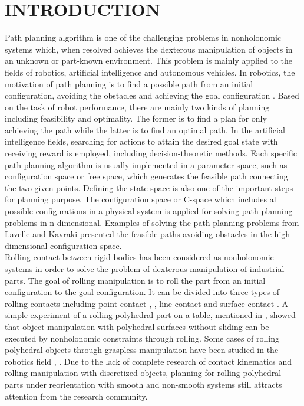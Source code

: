 
\section{INTRODUCTION}
\noindent Path planning algorithm is one of the challenging problems in nonholonomic systems which, when resolved achieves the dexterous manipulation of objects in an unknown or part-known environment. 
This problem is mainly applied to the fields of robotics, artificial intelligence and autonomous vehicles. 
In robotics, the motivation of path planning is to find a possible path from an initial configuration, avoiding the obstacles and achieving the goal configuration \cite{Zhang2018_PP_mobileRobot}. 
Based on the task of robot performance, there are mainly two kinds of planning including feasibility and optimality. 
The former is to find a plan for only achieving the path while the latter is to find an optimal path. 
In the artificial intelligence fields, searching for actions to attain the desired goal state with receiving reward is employed, including decision-theoretic methods. 
Each specific path planning algorithm is usually implemented in a parameter space, such as configuration space or free space, which generates the feasible path connecting the two given points. 
Defining the state space is also one of the important steps for planning purpose. The configuration space or C-space which includes all possible configurations in a physical system is applied for solving path planning problems in n-dimensional. 
Examples of solving the path planning problems from Lavelle \cite{LaValle06_PlanningAlgorithm} and Kavraki \cite{Kavraki96_PRM_HighDimensionSPace} presented the feasible paths avoiding obstacles in the high dimensional configuration space. \\

\noindent Rolling contact between rigid bodies has been considered as nonholonomic systems in order to solve the problem of dexterous manipulation of industrial parts. 
The goal of rolling manipulation is to roll the part from an initial configuration to the goal configuration. 
It can be divided into three types of rolling contacts including point contact \cite{Cai86_PlanarMotion_PointContact}, \cite{Cai87_SpatialMotion_PointContact}, line contact \cite{Cai88_SpatialMotion_LineContact} and surface contact \cite{Borisov08_ChaplypinBall_FixSphere}. 
A simple experiment of a rolling polyhedral part on a table, mentioned in \cite{Bicchi2004_Reachability_steering_Polyhedra}, showed that object manipulation with polyhedral surfaces without sliding can be executed by nonholonomic constraints through rolling. 
Some cases of rolling polyhedral objects through graspless manipulation have been studied in the robotics field \cite{Aiyama93_Pivoting}, \cite{Erdmann91_polyhedronRolling_on_table}. 
Due to the lack of complete research of contact kinematics and rolling manipulation with discretized objects, planning for rolling polyhedral parts under reorientation with smooth and non-smooth systems still attracts attention from the research community.\\

